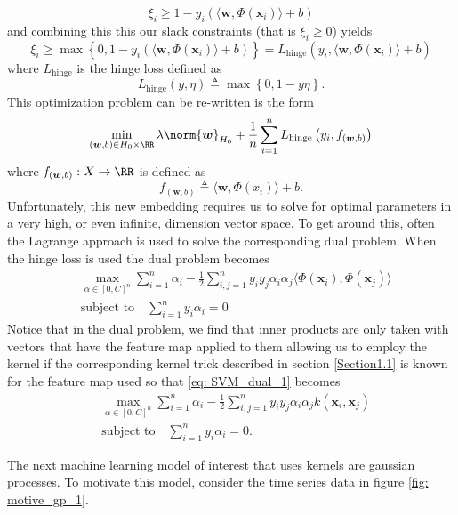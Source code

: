 \[
    \xi_i \geq 1 - y_i \left( \langle \bm{w} , \Phi \left( \bm{x}_i \right) \rangle + b \right)
\]
and combining this this our slack constraints (that is $\xi_i \geq 0$) yields
\[
    \xi_i \geq \max \left\{ 0, 1 - y_i \left( \langle \bm{w} , \Phi \left( \bm{x}_i \right) \rangle + b \right)  \right\} = L_{\text{hinge}} \left( y_i , \langle \bm{w} , \Phi \left( \bm{x}_i \right) \rangle + b \right)
\]
where $L_{\text{hinge}}$ is the hinge loss defined as
\[
    L_{\text{hinge}} \left( y,\eta \right) \triangleq \max \left\{ 0,1-y\eta \right\}.
\]
This optimization problem can be re-written is the form
\[
    \min_{\left( \bm{w} , b \right) \in H_0 \times \RR} \lambda \norm{\bm{w}}_{H_0} + \frac{1}{n} \sum_{i=1}^{n} L_{\text{hinge}} \left( y_i , f_{\left( \bm{w} , b \right)} \right)
\]
where $f_{\left( \bm{w} , b \right)} : X \to \RR$ is defined as
\[
    f_{\left( \bm{w} , b \right)} \triangleq \langle \bm{w} , \Phi \left( x_i \right) \rangle + b.
\]
Unfortunately, this new embedding requires us to solve for optimal parameters in a very high, or even infinite, dimension vector space. To get around this, often the Lagrange approach is used to solve the corresponding dual problem. When the hinge loss is used the dual problem becomes
\begin{align} \label{eq: SVM_dual_1}
     & \max_{\alpha \in \left[ 0,C \right]^n} \sum_{i=1}^{n} \alpha_i - \frac{1}{2} \sum_{i,j=1}^{n} y_i y_j \alpha_i \alpha_j \langle \Phi \left( \bm{x}_i \right), \Phi \left( \bm{x}_j \right) \rangle \nonumber \\
     & \text{subject to} \quad \sum_{i=1}^{n} y_i \alpha_i = 0
\end{align}
Notice that in the dual problem, we find that inner products are only taken with vectors that have the feature map applied to them allowing us to employ the kernel if the corresponding kernel trick described in section \ref{Section1.1} is known for the feature map used so that \ref{eq: SVM_dual_1} becomes
\begin{align*}
     & \max_{\alpha \in \left[ 0,C \right]^n} \sum_{i=1}^{n} \alpha_i - \frac{1}{2} \sum_{i,j=1}^{n} y_i y_j \alpha_i \alpha_j k \left( \bm{x}_i, \bm{x}_j \right) \\
     & \text{subject to} \quad \sum_{i=1}^{n} y_i \alpha_i = 0.
\end{align*}

The next machine learning model of interest that uses kernels are gaussian processes. To motivate this model, consider the time series data in figure \ref{fig: motive_gp_1}.

